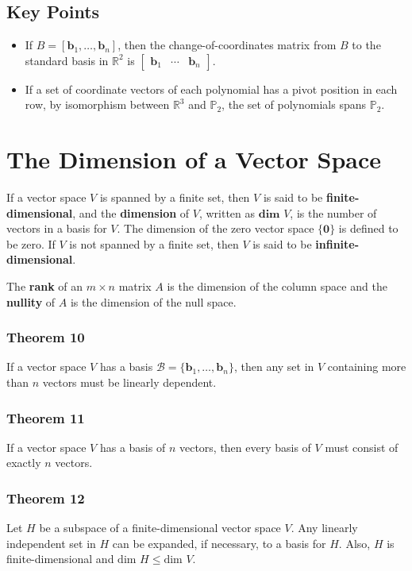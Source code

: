 \documentclass{article}
\begin{document}
\subsection*{Key Points}
\begin{itemize}
    \item If $B=\left[ \mathbf{b}_1, \ldots, \mathbf{b}_n\right]$, then the change-of-coordinates
    matrix from $B$ to the standard basis in $\mathbb{R}^2$ is
    $\begin{bmatrix} \mathbf{b}_1 & \cdots & \mathbf{b}_n\end{bmatrix}$.
    \item If a set of coordinate vectors of each polynomial has a pivot position in each row, by
    isomorphism between $\mathbb{R}^3$ and $\mathbb{P}_2$, the set of polynomials spans
    $\mathbb{P}_2$. 
\end{itemize}

\section*{The Dimension of a Vector Space}
If a vector space $V$ is spanned by a finite set, then $V$ is said to be
\textbf{finite-dimensional}, and the \textbf{dimension} of $V$, written as $\textbf{dim }V$, is the
number of vectors in a basis for $V$. The dimension of the zero vector space $\{\mathbf{0}\}$ is
defined to be zero. If $V$ is not spanned by a finite set, then $V$ is said to be
\textbf{infinite-dimensional}.

\vspace{1em}

The \textbf{rank} of an $m\times n$ matrix $A$ is the dimension of the column space and the
\textbf{nullity} of $A$ is the dimension of the null space.

\subsubsection*{Theorem 10}
If a vector space $V$ has a basis $\mathcal{B}=\{\mathbf{b}_1,\ldots, \mathbf{b}_n\}$, then any set
in $V$ containing more than $n$ vectors must be linearly dependent.

\subsubsection*{Theorem 11}
If a vector space $V$ has a basis of $n$ vectors, then every basis of $V$ must consist of exactly
$n$ vectors.

\subsubsection*{Theorem 12}
Let $H$ be a subspace of a finite-dimensional vector space $V$. Any linearly independent set in $H$
can be expanded, if necessary, to a basis for $H$. Also, $H$ is finite-dimensional and
$\text{dim }H\leq \text{dim }V$.
\end{document}
